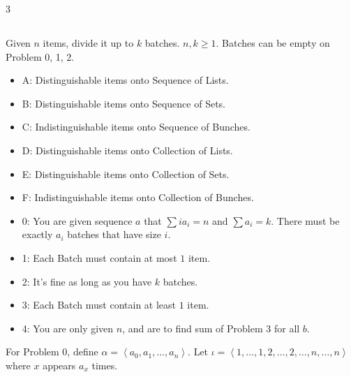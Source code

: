 \documentclass[landscape, 8pt, a4paper, oneside]{extarticle}
\begin{document}
\begin{multicols*}{3}
\subsection{}
Given $n$ items, divide it up to $k$ batches. $n, k \ge 1$. Batches can be empty on Problem 0, 1, 2.
\begin{itemize}
	\item A: Distinguishable items onto Sequence of Lists.
	\item B: Distinguishable items onto Sequence of Sets.
	\item C: Indistinguishable items onto Sequence of Bunches.
	\item D: Distinguishable items onto Collection of Lists.
	\item E: Distinguishable items onto Collection of Sets.
	\item F: Indistinguishable items onto Collection of Bunches.
	\item 0: You are given sequence $a$ that $\sum i a_i = n$ and $\sum a_i = k$. There must be exactly $a_i$ batches that have size $i$.
	\item 1: Each Batch must contain at most $1$ item.
	\item 2: It's fine as long as you have $k$ batches.
	\item 3: Each Batch must contain at least $1$ item.
	\item 4: You are only given $n$, and are to find sum of Problem 3 for all $b$.
\end{itemize}
For Problem 0, define $\alpha = \left< a_0, a_1, \ldots, a_n \right>$. Let $\iota = \left< 1, \ldots, 1, 2, \ldots, 2, \ldots, n, \ldots, n \right>$ where $x$ appears $a_x$ times.


\end{multicols*}
\end{document}
